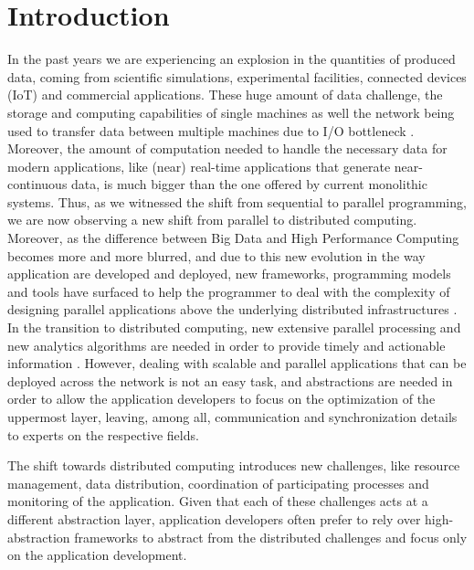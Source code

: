 \documentclass[12pt, oneside]{report}
\begin{document}
\chapter*{Introduction}
\label{introduction}
In the past years we are experiencing an explosion in the quantities of produced data, coming from scientific simulations, experimental facilities, connected devices (IoT) and commercial applications. These huge amount of data challenge, the storage and computing capabilities of single machines as well the network being used to transfer data between multiple machines due to I/O bottleneck \cite{exa-big}. Moreover, the amount of computation needed to handle the necessary data for modern applications, like (near) real-time applications that generate near-continuous data, is much bigger than the one offered by current monolithic systems. Thus, as we witnessed the shift from sequential to parallel programming, we are now observing a new shift from parallel to distributed computing. Moreover, as the difference between Big Data and High Performance Computing becomes more and more blurred, and due to this new evolution in the way application are developed and deployed, new frameworks, programming models and tools have surfaced to help the programmer to deal with the complexity of designing parallel applications above the underlying distributed infrastructures \cite{exa-big, survey-distributed}. In the transition to distributed computing, new extensive parallel processing and new analytics algorithms are needed in order to provide timely and actionable information \cite{big-data-movingforward}. However, dealing with scalable and parallel applications that can be deployed across the network is not an easy task, and abstractions are needed in order to allow the application developers to focus on the optimization of the uppermost layer, leaving, among all, communication and synchronization details to experts on the respective fields.

The shift towards distributed computing introduces new challenges, like resource management, data distribution, coordination of participating processes and monitoring of the application. Given that each of these challenges acts at a different abstraction layer, application developers often prefer to rely over high-abstraction frameworks to abstract from the distributed challenges and focus only on the application development.\newline
\end{document}
